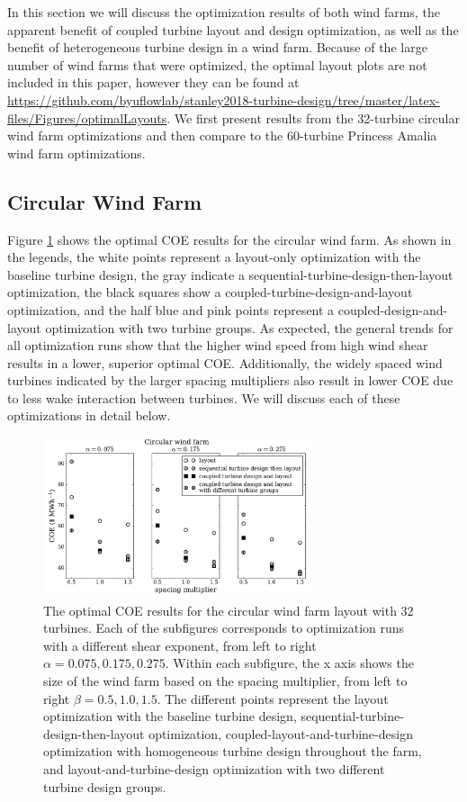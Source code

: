 \documentclass[WESD, manuscript]{copernicus}
\begin{document}
In this section we will discuss the optimization results of both wind farms, the apparent benefit of coupled turbine layout and design optimization, as well as the benefit of heterogeneous turbine design in a wind farm. Because of the large number of wind farms that were optimized, the optimal layout plots are not included in this paper, however they can be found at 
\url{https://github.com/byuflowlab/stanley2018-turbine-design/tree/master/latex-files/Figures/optimalLayouts}.
We first present results from the 32-turbine circular wind farm optimizations and then compare to the 60-turbine Princess Amalia wind farm optimizations. 


\subsection{Circular Wind Farm}

Figure \ref{circular_results} shows the optimal COE results for the circular wind farm. As shown in the legends, the white points represent a layout-only optimization with the baseline turbine design, the gray indicate a sequential-turbine-design-then-layout optimization, the black squares show a coupled-turbine-design-and-layout optimization, and the half blue and pink points represent a coupled-design-and-layout optimization with two turbine groups.  As expected, the general trends for all optimization runs show that the higher wind speed from high wind shear results in a lower, superior optimal COE. Additionally, the widely spaced wind turbines indicated by the larger spacing multipliers also result in lower COE due to less wake interaction between turbines. We will discuss each of these optimizations in detail below.


\begin{figure}[htbp]
  \centering
  \includegraphics[width=0.7\textwidth]{Figures/circular_results1.pdf}
  \caption{\label{circular_results} The optimal COE results for the circular wind farm layout with 32 turbines. Each of the subfigures corresponds to optimization runs with a different shear exponent, from left to right $\alpha=0.075,0.175,0.275$. Within each subfigure, the x axis shows the size of the wind farm based on the spacing multiplier, from left to right $\beta=0.5,1.0,1.5$. The different points represent the layout optimization with the baseline turbine design, sequential-turbine-design-then-layout optimization, coupled-layout-and-turbine-design optimization with homogeneous turbine design throughout the farm, and layout-and-turbine-design optimization with two different turbine design groups.}
\end{figure}
\end{document}
